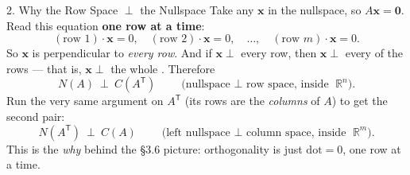 \documentclass[10pt]{article}
\newcommand{\xx}{\mathbf{x}}
\newcommand{\zero}{\mathbf{0}}
\newcommand{\T}{\mathsf{T}}
\begin{document}
\begin{notesbox}{2. Why the Row Space $\perp$ the Nullspace}
Take any $\xx$ in the nullspace, so $A\xx=\zero$. Read this equation \textbf{one row at a time}:
\[
  (\text{row }1)\cdot\xx=0,\quad (\text{row }2)\cdot\xx=0,\quad \dots,\quad (\text{row }m)\cdot\xx=0.
\]
So $\xx$ is perpendicular to \emph{every row}. And if $\xx\perp$ every row, then $\xx\perp$ every
\blank{3.2cm} of the rows --- that is, $\xx\perp$ the whole \blank{2.6cm}. Therefore
\[
  N(A)\ \perp\ C(A^{\T}) \qquad\text{(nullspace $\perp$ row space, inside }\mathbb{R}^n).
\]
Run the very same argument on $A^{\T}$ (its rows are the \emph{columns} of $A$) to get the second pair:
\[
  N(A^{\T})\ \perp\ C(A) \qquad\text{(left nullspace $\perp$ column space, inside }\mathbb{R}^m).
\]
This is the \emph{why} behind the §3.6 picture: orthogonality is just $\text{dot}=0$, one row at a time.
\end{notesbox}
\end{document}
